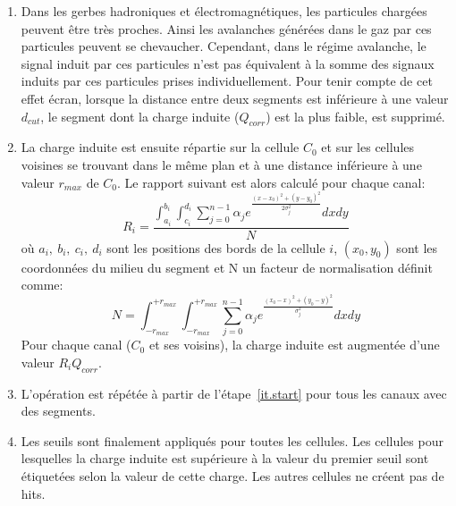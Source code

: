 \begin{enumerate}[~~1-]
\begin{equation}
\begin{array}{rl}
      Q_{ind} &\mbox{ sinon}
    \end{array} \right.
  \end{equation}
  où $d_s$ correspond à la longueur du segment, $d_{gap}$ à l'épaisseur du volume de gaz (1.2 $mm$) et $\kappa$ est un paramètre libre. Lorsque le segment traverse toute la couche de gaz, la grandeur $\frac{d_{gap}}{d_s}$ correspond au cosinus de l'angle entre la trajectoire du segment et la droite normale aux GRPC. La forme $\frac{d_s}{d_{gap}}$ est préférée à $\frac{1}{cos\theta}$ pour éviter un facteur correctif infini. L'effet et l'importance de cette correction seront discutés dans la partie~\ref{sec.param} de ce chapitre.
\item Dans les gerbes hadroniques et électromagnétiques, les particules chargées peuvent être très proches. Ainsi les avalanches générées dans le gaz par ces particules peuvent se chevaucher. Cependant, dans le régime avalanche, le signal induit par ces particules n'est pas équivalent à la somme des signaux induits par ces particules prises individuellement. Pour tenir compte de cet effet écran, lorsque la distance entre deux segments est inférieure à une valeur $d_{cut}$, le segment dont la charge induite ($Q_{corr}$) est la plus faible, est supprimé. %
\item \label{it.spliting} La charge induite est ensuite répartie sur la cellule $C_0$  et sur les cellules voisines se trouvant dans le même plan et à une distance inférieure à une valeur $r_{max}$ de $C_0$. Le rapport suivant est alors calculé pour chaque canal:
  \begin{equation}
    \label{eq.ratio}
    R_i = \frac{\int_{a_i}^{b_i}\int_{c_i}^{d_i}\sum_{j=0}^{n-1}\alpha_j e^{ \frac{(x-x_0)^2+(y-y_0)^2}{2\sigma_j^2}}dxdy}{N}
  \end{equation}
  où $a_i,\ b_i,\ c_i,\ d_i$ sont les positions des bords de la cellule $i$, $(x_0,y_0)$ sont les coordonnées du milieu du segment et N un facteur de normalisation définit comme: 
  \begin{equation}
    \label{eq.norm}
    N=\int_{-r_{max}}^{+r_{max}}\int_{-r_{max}}^{+r_{max}}\sum_{j=0}^{n-1}\alpha_j e^{ \frac{(x_0-x)^2+(y_0-y)^2}{\sigma_j^2}}dxdy
  \end{equation}
  Pour chaque canal ($C_0$ et ses voisins), la charge induite est augmentée d'une valeur $R_iQ_{corr}$.
\item L'opération est répétée à partir de l'étape~\ref{it.start} pour tous les canaux avec des segments.
\item Les seuils sont finalement appliqués pour toutes les cellules. Les cellules pour lesquelles la charge induite est supérieure à la valeur du premier seuil sont étiquetées selon la valeur de cette charge. Les autres cellules ne créent pas de hits. 
\end{enumerate}


